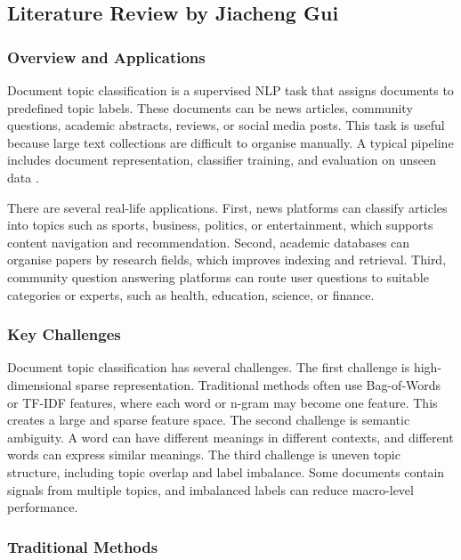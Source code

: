 \subsection{Literature Review by Jiacheng Gui}

\subsubsection{Overview and Applications}

Document topic classification is a supervised NLP task that assigns documents to predefined topic labels. These documents can be news articles, community questions, academic abstracts, reviews, or social media posts. This task is useful because large text collections are difficult to organise manually. A typical pipeline includes document representation, classifier training, and evaluation on unseen data \cite{sebastiani2002machine}.

There are several real-life applications. First, news platforms can classify articles into topics such as sports, business, politics, or entertainment, which supports content navigation and recommendation. Second, academic databases can organise papers by research fields, which improves indexing and retrieval. Third, community question answering platforms can route user questions to suitable categories or experts, such as health, education, science, or finance.

\subsubsection{Key Challenges}

Document topic classification has several challenges. The first challenge is high-dimensional sparse representation. Traditional methods often use Bag-of-Words or TF-IDF features, where each word or n-gram may become one feature. This creates a large and sparse feature space. The second challenge is semantic ambiguity. A word can have different meanings in different contexts, and different words can express similar meanings. The third challenge is uneven topic structure, including topic overlap and label imbalance. Some documents contain signals from multiple topics, and imbalanced labels can reduce macro-level performance.

\subsubsection{Traditional Methods}

